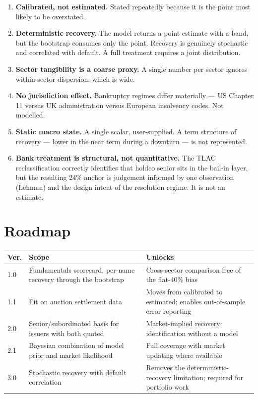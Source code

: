 \documentclass[11pt,a4paper]{article}
\begin{document}
\begin{enumerate}[leftmargin=1.4em,itemsep=0.3em]
\item \textbf{Calibrated, not estimated.} Stated repeatedly because it is the point
most likely to be overstated.

\item \textbf{Deterministic recovery.} The model returns a point estimate with a band,
but the bootstrap consumes only the point. Recovery is genuinely stochastic and
correlated with default. A full treatment requires a joint distribution.

\item \textbf{Sector tangibility is a coarse proxy.} A single number per sector ignores
within-sector dispersion, which is wide.

\item \textbf{No jurisdiction effect.} Bankruptcy regimes differ materially --- US
Chapter 11 versus UK administration versus European insolvency codes. Not modelled.

\item \textbf{Static macro state.} A single scalar, user-supplied. A term structure of
recovery --- lower in the near term during a downturn --- is not represented.

\item \textbf{Bank treatment is structural, not quantitative.} The TLAC reclassification
correctly identifies that holdco senior sits in the bail-in layer, but the resulting
24\% anchor is judgement informed by one observation (Lehman) and the design intent of
the resolution regime. It is not an estimate.
\end{enumerate}

\section{Roadmap}

\begin{center}
\begin{tabular}{p{1.1cm}p{5.4cm}p{8.0cm}}
\toprule
\textbf{Ver.} & \textbf{Scope} & \textbf{Unlocks} \\
\midrule
1.0 & Fundamentals scorecard, per-name recovery through the bootstrap & Cross-sector
comparison free of the flat-40\% bias \\[0.3em]
1.1 & Fit on auction settlement data & Moves from calibrated to estimated; enables
out-of-sample error reporting \\[0.3em]
2.0 & Senior/subordinated basis for issuers with both quoted & Market-implied recovery;
identification without a model \\[0.3em]
2.1 & Bayesian combination of model prior and market likelihood & Full coverage with
market updating where available \\[0.3em]
3.0 & Stochastic recovery with default correlation & Removes the deterministic-recovery
limitation; required for portfolio work \\
\bottomrule
\end{tabular}
\end{center}
\end{document}
